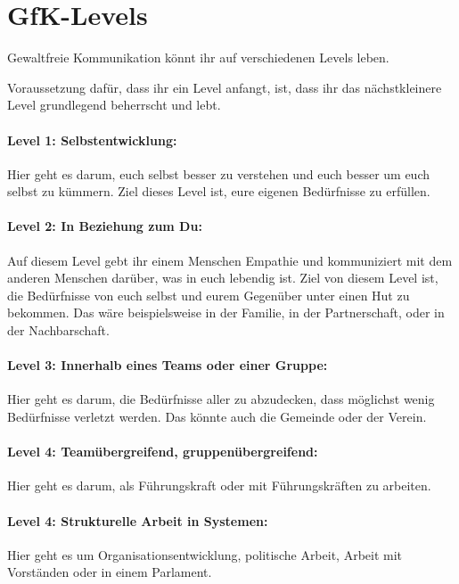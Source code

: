 \section{GfK-Levels}
\label{gfk-levels}

Gewaltfreie Kommunikation könnt ihr auf verschiedenen Levels leben.

Voraussetzung dafür, dass ihr ein Level anfangt, ist, dass ihr das nächstkleinere Level grundlegend beherrscht und lebt.

\paragraph{Level 1: Selbstentwicklung:} Hier geht es darum, euch selbst besser zu verstehen und euch besser um euch selbst zu kümmern. Ziel dieses Level ist, eure eigenen Bedürfnisse zu erfüllen.

\paragraph{Level 2: In Beziehung zum Du:} Auf diesem Level gebt ihr einem Menschen Empathie und kommuniziert mit dem anderen Menschen darüber, was in euch lebendig ist. Ziel von diesem Level ist, die Bedürfnisse von euch selbst und eurem Gegenüber unter einen Hut zu bekommen. Das wäre beispielsweise in der Familie, in der Partnerschaft, oder in der Nachbarschaft.

\paragraph{Level 3: Innerhalb eines Teams oder einer Gruppe:} Hier geht es darum, die Bedürfnisse aller zu abzudecken, dass möglichst wenig Bedürfnisse verletzt werden. Das könnte auch die Gemeinde oder der Verein.

\paragraph{Level 4: Teamübergreifend, gruppenübergreifend:} Hier geht es darum, als Führungskraft oder mit Führungskräften zu arbeiten.

\paragraph{Level 4: Strukturelle Arbeit in Systemen:} Hier geht es um Organisationsentwicklung, politische Arbeit, Arbeit mit Vorständen oder in einem Parlament.
